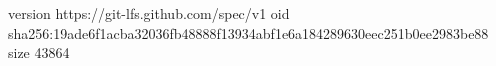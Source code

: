version https://git-lfs.github.com/spec/v1
oid sha256:19ade6f1acba32036fb48888f13934abf1e6a184289630eec251b0ee2983be88
size 43864
